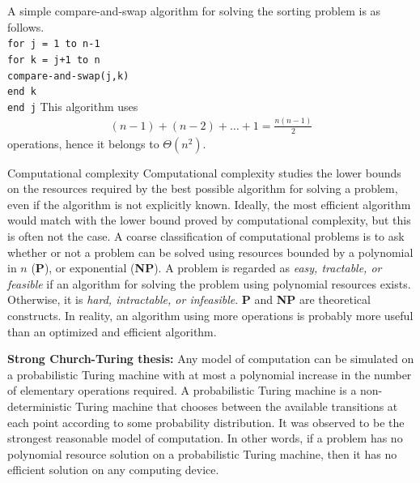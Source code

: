 \documentclass{beamer}
\begin{document}
\begin{frame}
\justify
A simple compare-and-swap algorithm for solving the sorting problem is as follows.\\
\texttt{for j = 1 to n-1\\
\hspace{0.5cm} for k = j+1 to n\\
\hspace{1cm} compare-and-swap(j,k)\\
\hspace{0.5cm} end k\\
end j}
\vfill
This algorithm uses
\begin{align*}
(n-1) + (n-2) + \ldots + 1 = \frac{n(n-1)}{2}
\end{align*}
operations, hence it belongs to $\Theta(n^2)$.
\end{frame}

\begin{frame}{Computational complexity}
\justify
Computational complexity studies the lower bounds on the resources required by the best possible algorithm for solving a problem, even if the algorithm is not explicitly known.
\vfill
Ideally, the most efficient algorithm would match with the lower bound proved by computational complexity, but this is often not the case.
\vfill
A coarse classification of computational problems is to ask whether or not a problem can be solved using resources bounded by a polynomial in $n$ (\textbf{P}), or exponential (\textbf{NP}).
\vfill
A problem is regarded as \textit{easy, tractable, or feasible} if an algorithm for solving the problem using polynomial resources exists. Otherwise, it is \textit{hard, intractable, or infeasible}.
\vfill
\textbf{P} and \textbf{NP} are theoretical constructs. In reality, an algorithm using more operations is probably more useful than an optimized and efficient algorithm.
\end{frame}

\begin{frame}
\justify
\textbf{Strong Church-Turing thesis:} Any model of computation can be simulated on a probabilistic Turing machine with at most a polynomial increase in the number of elementary operations required.
\vfill
A probabilistic Turing machine is a non-deterministic Turing machine that chooses between the available transitions at each point according to some probability distribution. It was observed to be the strongest reasonable model of computation.
\vfill
In other words, if a problem has no polynomial resource solution on a probabilistic Turing machine, then it has no efficient solution on any computing device.
\end{frame}
\end{document}
